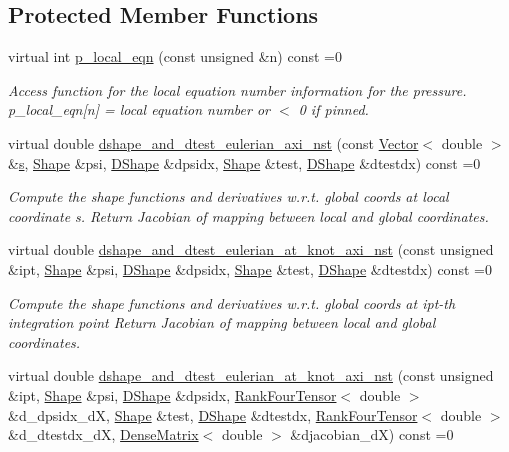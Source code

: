\subsection*{Protected Member Functions}
\begin{DoxyCompactItemize}
\item 
virtual int \hyperlink{classoomph_1_1AxisymmetricNavierStokesEquations_ad6ac62ca5fa411c365fd2ecc72aa25e8}{p\+\_\+local\+\_\+eqn} (const unsigned \&n) const =0
\begin{DoxyCompactList}\small\item\em Access function for the local equation number information for the pressure. p\+\_\+local\+\_\+eqn\mbox{[}n\mbox{]} = local equation number or $<$ 0 if pinned. \end{DoxyCompactList}\item 
virtual double \hyperlink{classoomph_1_1AxisymmetricNavierStokesEquations_a8d958da8ef73dcf5c68360edc9d9f565}{dshape\+\_\+and\+\_\+dtest\+\_\+eulerian\+\_\+axi\+\_\+nst} (const \hyperlink{classoomph_1_1Vector}{Vector}$<$ double $>$ \&\hyperlink{cfortran_8h_ab7123126e4885ef647dd9c6e3807a21c}{s}, \hyperlink{classoomph_1_1Shape}{Shape} \&psi, \hyperlink{classoomph_1_1DShape}{D\+Shape} \&dpsidx, \hyperlink{classoomph_1_1Shape}{Shape} \&test, \hyperlink{classoomph_1_1DShape}{D\+Shape} \&dtestdx) const =0
\begin{DoxyCompactList}\small\item\em Compute the shape functions and derivatives w.\+r.\+t. global coords at local coordinate s. Return Jacobian of mapping between local and global coordinates. \end{DoxyCompactList}\item 
virtual double \hyperlink{classoomph_1_1AxisymmetricNavierStokesEquations_a76e090fdac4507d10eb9f81feb53a51b}{dshape\+\_\+and\+\_\+dtest\+\_\+eulerian\+\_\+at\+\_\+knot\+\_\+axi\+\_\+nst} (const unsigned \&ipt, \hyperlink{classoomph_1_1Shape}{Shape} \&psi, \hyperlink{classoomph_1_1DShape}{D\+Shape} \&dpsidx, \hyperlink{classoomph_1_1Shape}{Shape} \&test, \hyperlink{classoomph_1_1DShape}{D\+Shape} \&dtestdx) const =0
\begin{DoxyCompactList}\small\item\em Compute the shape functions and derivatives w.\+r.\+t. global coords at ipt-\/th integration point Return Jacobian of mapping between local and global coordinates. \end{DoxyCompactList}\item 
virtual double \hyperlink{classoomph_1_1AxisymmetricNavierStokesEquations_a2cd0715a679af81bd0e3d7448a5560cb}{dshape\+\_\+and\+\_\+dtest\+\_\+eulerian\+\_\+at\+\_\+knot\+\_\+axi\+\_\+nst} (const unsigned \&ipt, \hyperlink{classoomph_1_1Shape}{Shape} \&psi, \hyperlink{classoomph_1_1DShape}{D\+Shape} \&dpsidx, \hyperlink{classoomph_1_1RankFourTensor}{Rank\+Four\+Tensor}$<$ double $>$ \&d\+\_\+dpsidx\+\_\+dX, \hyperlink{classoomph_1_1Shape}{Shape} \&test, \hyperlink{classoomph_1_1DShape}{D\+Shape} \&dtestdx, \hyperlink{classoomph_1_1RankFourTensor}{Rank\+Four\+Tensor}$<$ double $>$ \&d\+\_\+dtestdx\+\_\+dX, \hyperlink{classoomph_1_1DenseMatrix}{Dense\+Matrix}$<$ double $>$ \&djacobian\+\_\+dX) const =0

\end{DoxyCompactItemize}
